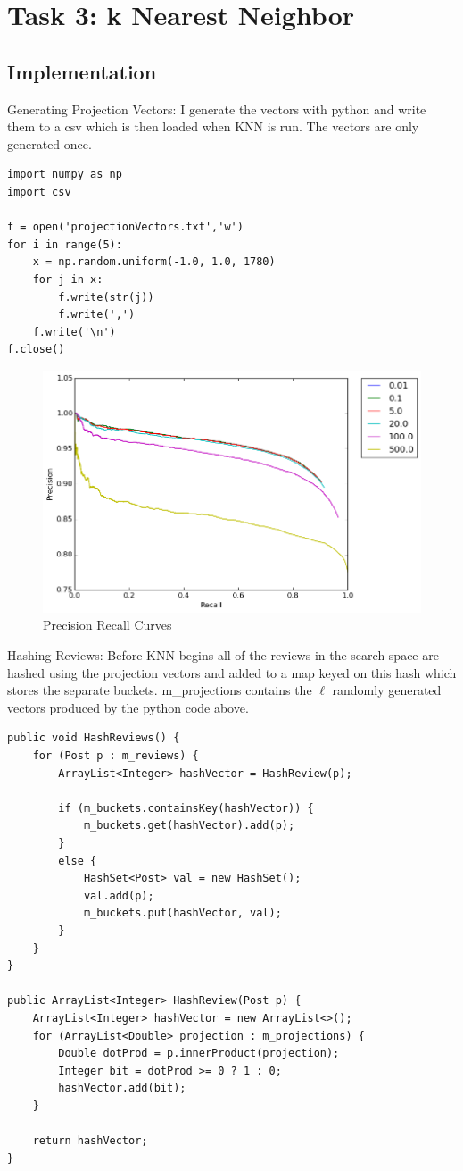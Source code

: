 \documentclass[paper=a4, fontsize=11pt]{jhwhw} %
\begin{document}
\section{Task 3: k Nearest Neighbor}
\subsection{Implementation}
Generating Projection Vectors: I generate the vectors with python and write them to a csv which is then loaded when KNN is run. The vectors are only generated once.
\begin{lstlisting}
import numpy as np
import csv

f = open('projectionVectors.txt','w')
for i in range(5):
    x = np.random.uniform(-1.0, 1.0, 1780)
    for j in x:
        f.write(str(j)) 
        f.write(',') 
    f.write('\n') 
f.close() 
\end{lstlisting}

\begin{figure}[h]
    \center
    \caption{Precision Recall Curves}
    \includegraphics[scale=.7]{curves}
\end{figure}


Hashing Reviews: Before KNN begins all of the reviews in the search space are hashed using the projection vectors and added to a map keyed on this hash which stores the separate buckets. m\_projections contains the $\ell$ randomly generated vectors produced by the python code above. 
\begin{lstlisting}
public void HashReviews() {
    for (Post p : m_reviews) {
        ArrayList<Integer> hashVector = HashReview(p);

        if (m_buckets.containsKey(hashVector)) {
            m_buckets.get(hashVector).add(p);
        }
        else {
            HashSet<Post> val = new HashSet();
            val.add(p);
            m_buckets.put(hashVector, val);
        }
    }
}

public ArrayList<Integer> HashReview(Post p) {
    ArrayList<Integer> hashVector = new ArrayList<>();
    for (ArrayList<Double> projection : m_projections) {
        Double dotProd = p.innerProduct(projection);
        Integer bit = dotProd >= 0 ? 1 : 0;
        hashVector.add(bit);
    }

    return hashVector;
}
\end{lstlisting}
\end{document}
